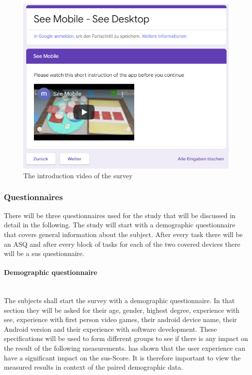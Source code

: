 \begin{figure}[H]
  \centering
  \includegraphics[width=1\textwidth]{Evaluation/img/form_video.png}
  \caption{The introduction video of the survey}\label{fig:video}
\end{figure}

\subsubsection{Questionnaires}
\label{questionaires}
There will be three questionnaires used for the study that will be discussed in detail in the following.
The study will start with a demographic questionnaire that covers general information about the subject.
After every task there will be an \gls{ASQ} and after every block of tasks for each of the two covered devices there will be a \gls{sus} questionnaire.
\paragraph{Demographic questionnaire}\mbox{}\\
The subjects shall start the survey with a demographic questionnaire.
In that section they will be asked for their age, gender, highest degree, experience with \gls{see}, experience with first person video games, their \gls{android} device name, their Android version and their experience with software development.
These specifications will be used to form different groups to see if there is any impact on the result of the following measurements. 
\cite{Mclellan2011} has shown that the user experience can have a significant impact on the \gls{sus}-Score.
It is therefore important to view the measured results in context of the paired demographic data.

